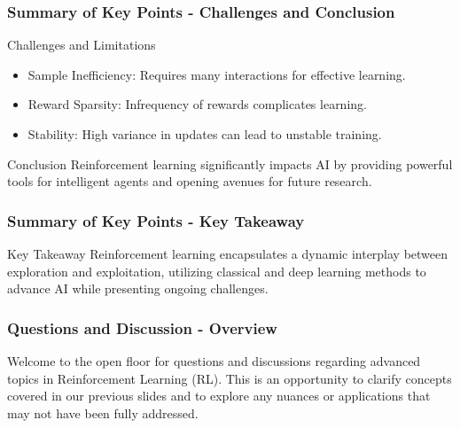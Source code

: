 \documentclass[aspectratio=169]{beamer}
\begin{document}
\begin{frame}[fragile]
    \frametitle{Summary of Key Points - Challenges and Conclusion}
    \begin{block}{Challenges and Limitations}
        \begin{itemize}
            \item Sample Inefficiency: Requires many interactions for effective learning.
            \item Reward Sparsity: Infrequency of rewards complicates learning.
            \item Stability: High variance in updates can lead to unstable training.
        \end{itemize}
    \end{block}
    
    \begin{block}{Conclusion}
        Reinforcement learning significantly impacts AI by providing powerful tools for intelligent agents and opening avenues for future research.
    \end{block}
\end{frame}

\begin{frame}[fragile]
    \frametitle{Summary of Key Points - Key Takeaway}
    \begin{block}{Key Takeaway}
        Reinforcement learning encapsulates a dynamic interplay between exploration and exploitation, utilizing classical and deep learning methods to advance AI while presenting ongoing challenges.
    \end{block}
\end{frame}

\begin{frame}[fragile]
    \frametitle{Questions and Discussion - Overview}
    Welcome to the open floor for questions and discussions regarding advanced topics in Reinforcement Learning (RL). This is an opportunity to clarify concepts covered in our previous slides and to explore any nuances or applications that may not have been fully addressed.
\end{frame}
\end{document}

